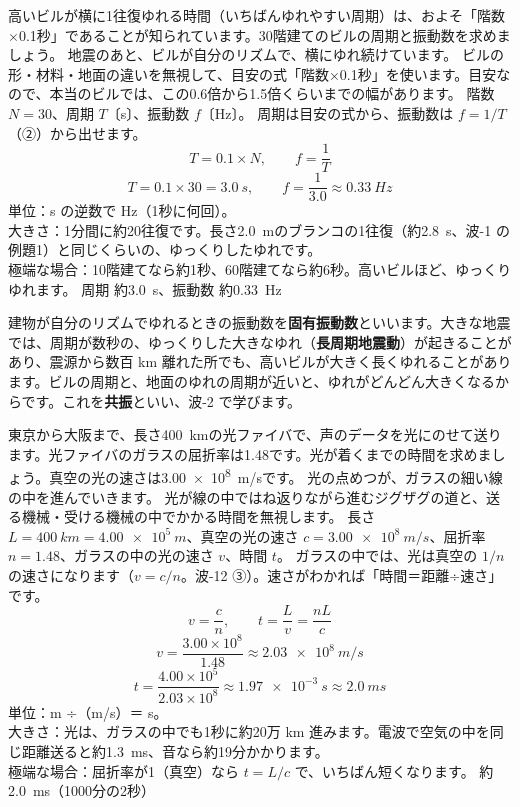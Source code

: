 \begin{phreidai}\label{ph:波-0:ex2}
高いビルが横に1往復ゆれる時間（いちばんゆれやすい周期）は、およそ「階数×0.1秒」であることが知られています。30階建てのビルの周期と振動数を求めましょう。
\phbamen
地震のあと、ビルが自分のリズムで、横にゆれ続けています。
\phmushi
ビルの形・材料・地面の違いを無視して、目安の式「階数×0.1秒」を使います。目安なので、本当のビルでは、この0.6倍から1.5倍くらいまでの幅があります。
\phzu
階数 $N=30$、周期 $T$〔s〕、振動数 $f$〔Hz〕。
\phriyu
周期は目安の式から、振動数は $f=1/T$（②）から出せます。
\phtateru
\[T=0.1\times N,\qquad f=\frac{1}{T}\]
\phtoku
\[T=0.1\times30=\qty{3.0}{s},\qquad f=\frac{1}{3.0}\approx\qty{0.33}{Hz}\]
\phtashikame
単位：s の逆数で Hz（1秒に何回）。\\
大きさ：1分間に約20往復です。長さ\qty{2.0}{m}のブランコの1往復（約\qty{2.8}{s}、波-1 の例題1）と同じくらいの、ゆっくりしたゆれです。\\
極端な場合：10階建てなら約1秒、60階建てなら約6秒。高いビルほど、ゆっくりゆれます。
\kotae 周期 約\qty{3.0}{s}、振動数 約\qty{0.33}{Hz}
\end{phreidai}
\noindent 建物が自分のリズムでゆれるときの振動数を\textbf{固有振動数}といいます。大きな地震では、周期が数秒の、ゆっくりした大きなゆれ（\textbf{長周期地震動}）が起きることがあり、震源から数百 km 離れた所でも、高いビルが大きく長くゆれることがあります。ビルの周期と、地面のゆれの周期が近いと、ゆれがどんどん大きくなるからです。これを\textbf{共振}といい、波-2 で学びます。

\begin{phreidai}\label{ph:波-0:ex3}
東京から大阪まで、長さ\qty{400}{km}の光ファイバで、声のデータを光にのせて送ります。光ファイバのガラスの屈折率は1.48です。光が着くまでの時間を求めましょう。真空の光の速さは\qty{3.00e8}{m/s}です。
\phbamen
光の点めつが、ガラスの細い線の中を進んでいきます。
\phmushi
光が線の中ではね返りながら進むジグザグの道と、送る機械・受ける機械の中でかかる時間を無視します。
\phzu
長さ $L=\qty{400}{km}=\qty{4.00e5}{m}$、真空の光の速さ $c=\qty{3.00e8}{m/s}$、屈折率 $n=1.48$、ガラスの中の光の速さ $v$、時間 $t$。
\phriyu
ガラスの中では、光は真空の $1/n$ の速さになります（$v=c/n$。波-12 ③）。速さがわかれば「時間＝距離÷速さ」です。
\phtateru
\[v=\frac{c}{n},\qquad t=\frac{L}{v}=\frac{nL}{c}\]
\phtoku
\[v=\frac{3.00\times10^8}{1.48}\approx\qty{2.03e8}{m/s}\]
\[t=\frac{4.00\times10^5}{2.03\times10^8}\approx\qty{1.97e-3}{s}\approx\qty{2.0}{ms}\]
\phtashikame
単位：m ÷（m/s）＝ s。\\
大きさ：光は、ガラスの中でも1秒に約20万 km 進みます。電波で空気の中を同じ距離送ると約\qty{1.3}{ms}、音なら約19分かかります。\\
極端な場合：屈折率が1（真空）なら $t=L/c$ で、いちばん短くなります。
\kotae 約\qty{2.0}{ms}（1000分の2秒）
\end{phreidai}

